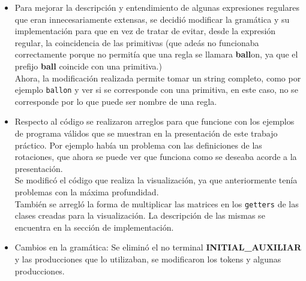 \begin{itemize}
\item Para mejorar la descripci\'on y entendimiento de algunas expresiones regulares que eran innecesariamente extensas, se decidi\'o modificar la gram\'atica y su implementaci\'on para que en vez de tratar de evitar, desde la expresi\'on regular, la coincidencia de las primitivas (que ade\'as no funcionaba correctamente porque no permit\'ia que una regla se llamara \textbf{ball}on, ya que el prefijo \textbf{ball} coincide con una primitiva.) \\
Ahora, la modificaci\'on realizada permite tomar un string completo, como por ejemplo \texttt{ballon} y ver si se corresponde con una primitiva, en este caso, no se corresponde por lo que puede ser nombre de una regla.

\item Respecto al c\'odigo se realizaron arreglos para que funcione con los ejemplos de programa v\'alidos que se muestran en la presentaci\'on de este trabajo pr\'actico. Por ejemplo hab\'ia un problema con las definiciones de las rotaciones, que ahora se puede ver que funciona como se deseaba acorde a la presentaci\'on.
\\
Se modific\'o el c\'odigo que realiza la visualizaci\'on, ya que anteriormente ten\'ia problemas con la m\'axima profundidad.
\\
Tambi\'en se arregl\'o la forma de multiplicar las matrices en los \texttt{getters} de las clases creadas para la visualizaci\'on. La descripci\'on de las mismas se encuentra en la secci\'on de implementaci\'on.


\item Cambios en la gram\'atica: Se elimin\'o el no terminal \textbf{INITIAL\_AUXILIAR} y las producciones que lo utilizaban, se modificaron los tokens y algunas producciones.

\end{itemize}



